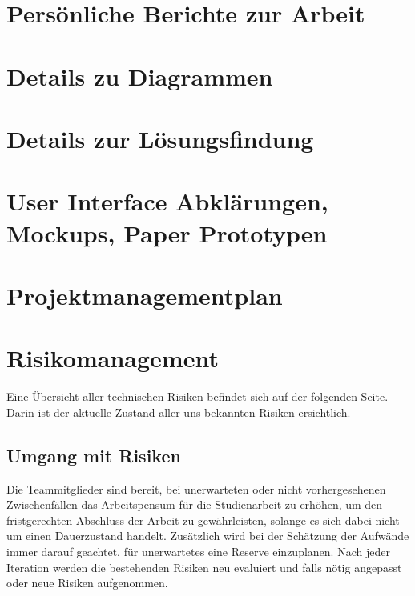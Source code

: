 \documentclass[12pt, a4paper]{report}
\begin{document}
	
	\chapter{Persönliche Berichte zur Arbeit}
	
	\chapter{Details zu Diagrammen}
	
	\chapter{Details zur Lösungsfindung}
	
	
	
	\chapter{User Interface Abklärungen, Mockups, Paper Prototypen}
	
	\chapter{Projektmanagementplan}
	
	
	\chapter{Risikomanagement}
	Eine Übersicht aller technischen Risiken befindet sich auf der folgenden Seite. Darin ist der aktuelle Zustand aller uns bekannten Risiken ersichtlich.
	
	\section{Umgang mit Risiken}
	Die Teammitglieder sind bereit, bei unerwarteten oder nicht vorhergesehenen Zwischenfällen das Arbeitspensum für die Studienarbeit zu erhöhen, um den fristgerechten Abschluss der Arbeit zu gewährleisten, solange es sich dabei nicht um einen Dauerzustand handelt. Zusätzlich wird bei der Schätzung der Aufwände immer darauf geachtet, für unerwartetes eine Reserve einzuplanen.
	Nach jeder Iteration werden die bestehenden Risiken neu evaluiert und falls nötig angepasst oder neue Risiken aufgenommen.
	
\end{document}
